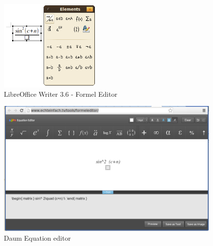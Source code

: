 \documentclass[a4paper]{scrartcl}
\begin{document}
    \begin{figure}[h]
        \centering
        \includegraphics*[width=5cm, keepaspectratio]{figures/libreoffice-writer.png}
        \caption{LibreOffice Writer 3.6 - Formel Editor}
        \label{fig:libre-office-3.6}
    \end{figure}

    \begin{figure}[h]
        \centering
        \includegraphics*[width=15cm, keepaspectratio]{figures/daum-editor.png}
        \caption{Daum Equation editor}
        \label{fig:daum-editor}
    \end{figure}
\break
\end{document}
